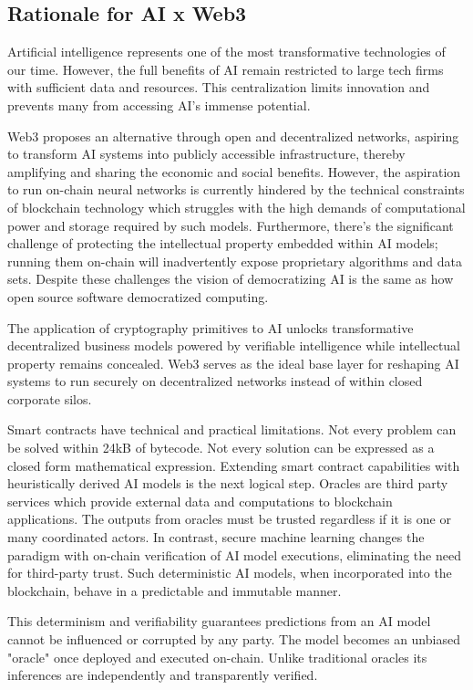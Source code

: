 \documentclass[conference]{IEEEtran}
\begin{document}
\subsection{Rationale for AI x Web3}
Artificial intelligence represents one of the most transformative technologies of our time. However, the full benefits of AI remain restricted to large tech firms with sufficient data and resources. This centralization limits innovation and prevents many from accessing AI's immense potential.  

Web3 proposes an alternative through open and decentralized networks, aspiring to transform AI systems into publicly accessible infrastructure, thereby amplifying and sharing the economic and social benefits. However, the aspiration to run on-chain neural networks is currently hindered by the technical constraints of blockchain technology which struggles with the high demands of computational power and storage required by such models. Furthermore, there's the significant challenge of protecting the intellectual property embedded within AI models; running them on-chain will inadvertently expose proprietary algorithms and data sets. Despite these challenges the vision of democratizing AI is the same as how open source software democratized computing.

The application of cryptography primitives to AI unlocks transformative decentralized business models powered by verifiable intelligence while intellectual property remains concealed.  Web3 serves as the ideal base layer for reshaping AI systems to run securely on decentralized networks instead of within closed corporate silos.

Smart contracts have technical and practical limitations. Not every problem can be solved within 24kB of bytecode. Not every solution can be expressed as a closed form mathematical expression. Extending smart contract capabilities with heuristically derived AI models is the next logical step. Oracles are third party services which provide external data and computations to blockchain applications. The outputs from oracles must be trusted regardless if it is one or many coordinated actors.  In contrast, secure machine learning changes the paradigm with on-chain verification of AI model executions, eliminating the need for third-party trust. Such deterministic AI models, when incorporated into the blockchain, behave in a predictable and immutable manner.

This determinism and verifiability guarantees predictions from an AI model cannot be influenced or corrupted by any party. The model becomes an unbiased "oracle" once deployed and executed on-chain. Unlike traditional oracles its inferences are independently and transparently verified. \\
\end{document}
